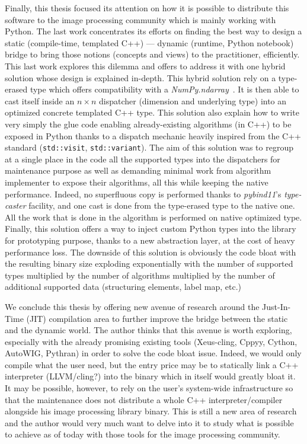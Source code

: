 Finally, this thesis focused its attention on how it is possible to distribute this software to the image processing
community which is mainly working with Python. The last work concentrates its efforts on finding the best way to design
a static (compile-time, templated C++) --- dynamic (runtime, Python notebook) bridge to bring those notions (concepts
and views) to the practitioner, efficiently. This last work explores this dilemma and offers to address it with one
hybrid solution whose design is explained in-depth. This hybrid solution rely on a type-erased type which offers
compatibility with a \emph{NumPy.ndarray}~\parencite{harris.2020.numpy}. It is then able to cast itself inside an \(n
\times n\) dispatcher (dimension and underlying type) into an optimized concrete templated C++ type. This solution also
explain how to write very simply the glue code enabling already-existing algorithms (in C++) to be exposed in Python
thanks to a dispatch mechanic heavily inspired from the C++ standard (\texttt{std::visit}, \texttt{std::variant}). The
aim of this solution was to regroup at a single place in the code all the supported types into the dispatchers for
maintenance purpose as well as demanding minimal work from algorithm implementer to expose their algorithms, all this
while keeping the native performance. Indeed, no superfluous copy is performed thanks to \emph{pybind11}'s
\emph{type-caster} facility, and one cast is done from the type-erased type to the native one. All the work that is done
in the algorithm is performed on native optimized type. Finally, this solution offers a way to inject custom Python
types into the library for prototyping purpose, thanks to a new abstraction layer, at the cost of heavy performance
loss. The downside of this solution is obviously the code bloat with the resulting binary size exploding exponentially
with the number of supported types multiplied by the number of algorithms multiplied by the number of additional
supported data (structuring elements, label map, etc.)

We conclude this thesis by offering new avenue of research around the Just-In-Time (JIT) compilation area to further
improve the bridge between the static and the dynamic world. The author thinks that this avenue is worth exploring,
especially with the already promising existing tools (Xeus-cling, Cppyy, Cython, AutoWIG, Pythran) in order to solve the
code bloat issue. Indeed, we would only compile what the user need, but the entry price may be to statically link a C++
interpreter (LLVM/cling?) into the binary which in itself would greatly bloat it. It may be possible, however, to rely
on the user's system-wide infrastructure so that the maintenance does not distribute a whole C++ interpreter/compiler
alongside his image processing library binary. This is still a new area of research and the author would very much want
to delve into it to study what is possible to achieve as of today with those tools for the image processing community.
